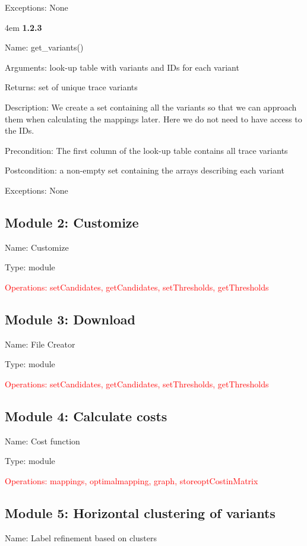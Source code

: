 \documentclass[notitlepage]{article}
\begin{document}
\begin{flushleft}
Exceptions: None

\par
\endgroup

\medskip

\par
\begingroup
\leftskip4em
\textbf{1.2.3}

Name: get\_variants()

Arguments: look-up table with variants and IDs for each variant

Returns: set of unique trace variants

Description: We create a set containing all the variants so that we can approach them when calculating the mappings later. Here we do not need to have access to the IDs.

Precondition: The first column of the look-up table contains all trace variants

Postcondition: a non-empty set containing the arrays describing each variant

Exceptions: None

\par
\endgroup

\subsection{Module 2: Customize}
Name: Customize

Type: module

\textcolor{red}{Operations: setCandidates, getCandidates, setThresholds, getThresholds}




\subsection{Module 3: Download}
Name: File Creator

Type: module

\textcolor{red}{Operations: setCandidates, getCandidates, setThresholds, getThresholds}

\subsection{Module 4: Calculate costs}
Name: Cost function

Type: module

\textcolor{red}{Operations: mappings, optimalmapping, graph, storeoptCostinMatrix}


\subsection{Module 5: Horizontal clustering of variants}
Name: Label refinement based on clusters


\end{flushleft}
\end{document}
